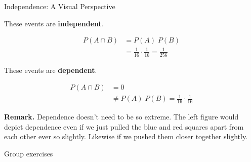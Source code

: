 \documentclass[10pt]{beamer}
\begin{document}
\begin{frame}{Independence: A Visual Perspective}
\begin{minipage}{.45\textwidth}
\begin{tikzpicture}[scale=0.68, every node/.style={font=\footnotesize}]
\end{tikzpicture}
\end{minipage} %

\vfill 
\pause 

\begin{minipage}{.45\textwidth}
\centering
These events are \textbf{independent}.

\begin{align*}
P(A \cap B) &= P(A) \; P(B) \\
&= \frac{1}{16} \cdot \frac{1}{16}   = \frac{1}{256} 
\end{align*}
\end{minipage} %
\hfill 
\pause 
\begin{minipage}{.45\textwidth}
\centering
These events are \textbf{dependent}.

\begin{align*}
P(A \cap B) &= 0  \\
& \neq  P(A) \; P(B) = \frac{1}{16} \cdot \frac{1}{16}
\end{align*}
\end{minipage} %
\vfill 
\pause 
\colorbox{orange!30}{\textbf{Remark.}} Dependence doesn't need to be so extreme. The left  figure would depict dependence even if we just pulled the blue and red squares apart from each other ever so slightly.  Likewise if we pushed them closer together slightly.
\end{frame}


\begin{frame}[standout]
Group exercises
\end{frame}
\end{document}
